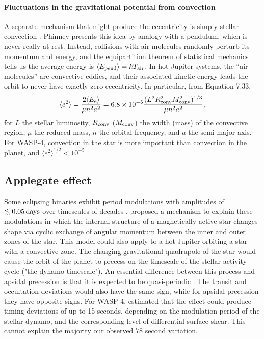\documentclass[12pt,twocolumn,tighten]{aastex62}
\begin{document}
\paragraph{Fluctuations in the gravitational potential from convection}
A separate mechanism that might produce the eccentricity is simply
stellar convection \citep[][Section 7]{phinney_pulsars_1992}.  Phinney
presents this idea by analogy with a pendulum, which is never really
at rest. Instead, collisions with air molecules randomly perturb its
momentum and energy, and the equipartition theorem of statistical
mechanics tells us the average energy is $\langle E_{\rm pend} \rangle
= k T_{\rm air}$.  In hot Jupiter systems, the ``air molecules'' are
convective eddies, and their associated kinetic energy leads the orbit
to never have exactly zero eccentricity.  In particular, from
\citealt{phinney_pulsars_1992} Equation 7.33,
\begin{equation}
  \langle e^2 \rangle =
  \frac{ 2 \langle E_{\rm e} \rangle }{\mu n^2 a^2}
  = 6.8\times10^{-5}
  \frac{(L^2 R_{\rm conv}^2 M_{\rm conv}^2)^{1/3}}{\mu n^2 a^2},
\end{equation}
for $L$ the stellar luminosity, $R_{\rm conv}$ ($M_{\rm conv}$) the
width (mass) of the convective region,  $\mu$ the reduced mass, $n$
the orbital frequency, and $a$ the semi-major axis.  For WASP-4,
convection in the star is more important than convection in the
planet, and $\langle e^2 \rangle^{1/2} < 10^{-5}$.


\subsection{Applegate effect}
Some eclipsing binaries exhibit period modulations with amplitudes of
$\lesssim 0.05\,{\rm days}$ over timescales of decades \citep[{\it
e.g.},][]{soderhjelm_geometry_1980,hall_relation_1989}.
\citet{applegate_mechanism_1992} proposed a mechanism to explain these
modulations in which the internal structure of a magnetically active
star changes shape via cyclic exchange of angular momentum between the
inner and outer zones of the star.  This model could also apply to a
hot Jupiter orbiting a star with a convective zone.  The changing
gravitational quadrupole of the star would cause the orbit of the
planet to precess on the timescale of the stellar activity cycle ("the
dynamo timescale").  An essential difference between this process and
apsidal precession is that it is expected to be quasi-periodic
\citep[{\it e.g.},][Figure~12]{soderhjelm_geometry_1980}.  The transit
and occultation deviations would also have the same sign, while for
apsidal precession they have opposite signs.  For WASP-4,
\citet{watson_orbital_2010} estimated that the effect could produce
timing deviations of up to 15 seconds, depending on the modulation
period of the stellar dynamo, and the corresponding level of
differential surface shear.  This cannot explain the majority our
observed $78$ second variation.
\end{document}
